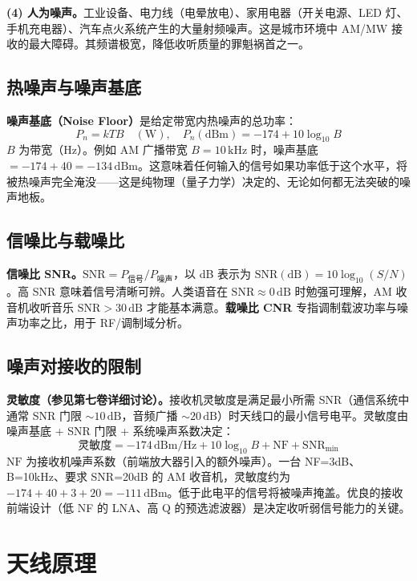 \documentclass[12pt,UTF8]{ctexbook}
\begin{document}
\textbf{(4) 人为噪声。}工业设备、电力线（电晕放电）、家用电器（开关电源、LED 灯、手机充电器）、汽车点火系统产生的大量射频噪声。这是城市环境中 AM/MW 接收的最大障碍。其频谱极宽，降低收听质量的罪魁祸首之一。

\subsection{热噪声与噪声基底}

\textbf{噪声基底（Noise Floor）}是给定带宽内热噪声的总功率：
\[
P_n = kTB \quad (\mathrm{W}),\quad P_n(\mathrm{dBm}) = -174 + 10\log_{10}B
\]
$B$ 为带宽（Hz）。例如 AM 广播带宽 $B=10\,\mathrm{kHz}$ 时，噪声基底 $=-174+40=-134\,\mathrm{dBm}$。这意味着任何输入的信号如果功率低于这个水平，将被热噪声完全淹没——这是纯物理（量子力学）决定的、无论如何都无法突破的噪声地板。

\subsection{信噪比与载噪比}

\textbf{信噪比 SNR。}$\mathrm{SNR} = P_{\text{信号}}/P_{\text{噪声}}$，以 dB 表示为 $\mathrm{SNR(dB)} = 10\log_{10}(S/N)$。高 SNR 意味着信号清晰可辨。人类语音在 $\mathrm{SNR}\approx 0\,\mathrm{dB}$ 时勉强可理解，AM 收音机收听音乐 $\mathrm{SNR}>30\,\mathrm{dB}$ 才能基本满意。\textbf{载噪比 CNR} 专指调制载波功率与噪声功率之比，用于 RF/调制域分析。

\subsection{噪声对接收的限制}

\textbf{灵敏度（参见第七卷详细讨论）。}接收机灵敏度是满足最小所需 SNR（通信系统中通常 SNR 门限 $\sim10\,\mathrm{dB}$，音频广播 $\sim20\,\mathrm{dB}$）时天线口的最小信号电平。灵敏度由噪声基底 + SNR 门限 + 系统噪声系数决定：
\[
\text{灵敏度} = -174\,\mathrm{dBm/Hz} + 10\log_{10}B + \mathrm{NF} + \mathrm{SNR}_{\text{min}}
\]
$\mathrm{NF}$ 为接收机噪声系数（前端放大器引入的额外噪声）。一台 NF=3dB、B=10kHz、要求 SNR=20dB 的 AM 收音机，灵敏度约为 $-174+40+3+20=-111\,\mathrm{dBm}$。低于此电平的信号将被噪声掩盖。优良的接收前端设计（低 NF 的 LNA、高 Q 的预选滤波器）是决定收听弱信号能力的关键。

\section{天线原理}
\label{sec:antenna}
\end{document}
